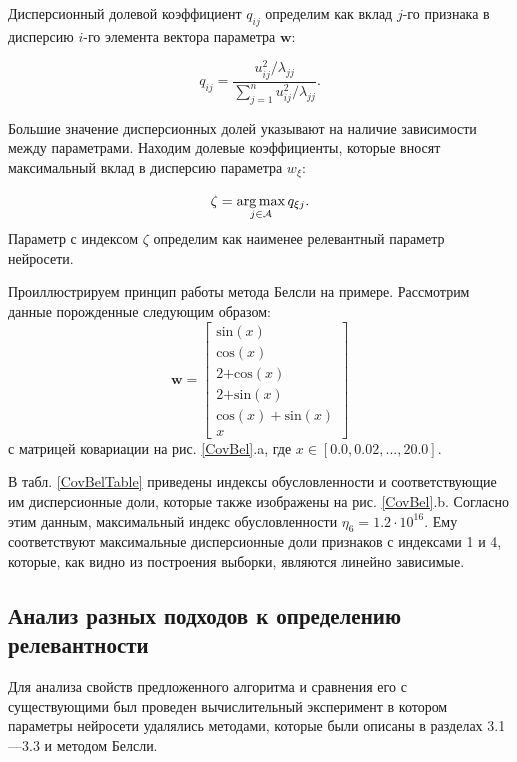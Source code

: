Дисперсионный долевой коэффициент $q_{ij}$ определим как вклад $j$-го признака в дисперсию $i$-го элемента вектора параметра $\textbf{w}$:

\[
\label{4.3}
q_{ij} = \frac{u^2_{ij}/\lambda_{jj}}{\sum^n_{j=1}{u^2_{ij}/\lambda_{jj}}}.
\]

Большие значение дисперсионных долей указывают на наличие зависимости между параметрами. Находим долевые коэффициенты, которые вносят максимальный вклад в дисперсию параметра $w_\xi$:

\[
\label{4.4}
\zeta = \operatorname*{arg\,max}_{j\in \mathcal{A}}{q_{\xi j}}.
\]
Параметр с индексом $\zeta$ определим как наименее релевантный параметр нейросети. 

Проиллюстрируем принцип работы метода Белсли на примере. Рассмотрим данные порожденные следующим образом: 
\[
\textbf{w} = \begin{bmatrix}
\text{sin}(x)\\
\text{cos}(x)\\
\text{2+cos}(x)\\
\text{2+sin}(x)\\
\text{cos}(x) + \text{sin}(x)\\
x
\end{bmatrix}
\]
с матрицей ковариации на рис. \ref{CovBel}.a, где $x \in [0.0, 0.02, ..., 20.0]$.


В табл. \ref{CovBelTable} приведены индексы обусловленности и соответствующие им дисперсионные доли, которые также изображены на рис. \ref{CovBel}.b. Согласно этим данным, максимальный индекс обусловленности $\eta_6 = 1.2\cdot 10^{16}$. Ему соответствуют максимальные дисперсионные доли признаков с индексами 1 и 4, которые, как видно из построения выборки, являются линейно зависимые.

\subsection{Анализ разных подходов к определению релевантности}
Для анализа свойств предложенного алгоритма и сравнения его с существующими был проведен вычислительный эксперимент в котором параметры нейросети удалялись методами,  которые были описаны в разделах 3.1---3.3 и методом Белсли.

